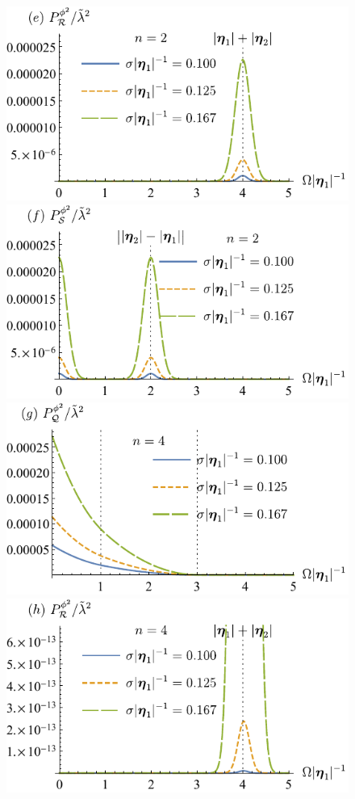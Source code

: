 \documentclass[11pt,prd,onecolumn,superscriptaddress,nofootinbib,floatfix,amsmath,amssymb]{revtex4-2}
\begin{document}
\begin{figure}[tp]
        \includegraphics[scale=0.64]{Fig6e.pdf}
        \includegraphics[scale=0.64]{Fig6f.pdf}
        \includegraphics[scale=0.64]{Fig6g.pdf}
        \includegraphics[scale=0.64]{Fig6h.pdf}

\end{figure}
\end{document}

